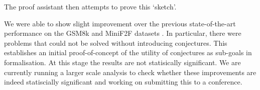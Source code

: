 The proof assistant then attempts to prove this `sketch'.
\par We were able to show slight improvement over the previous state-of-the-art performance on the GSM8k and MiniF2F datasets \cite{GSM8k,Minif2f}. In particular, there were problems that could not be solved without introducing conjectures. This establishes an initial proof-of-concept of the utility of conjectures as sub-goals in formalisation. At this stage the results are not statisically significant. We are currently running a larger scale analysis to check whether these improvements are indeed statiscially significant and working on submitting this to a conference.
